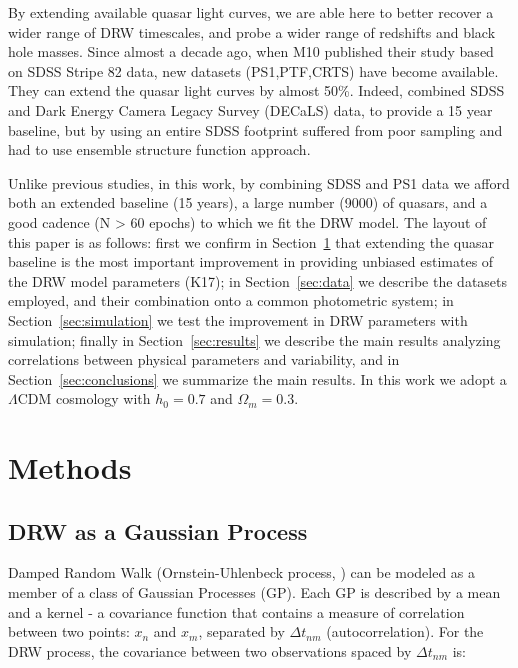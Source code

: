 \documentclass[twocolumn]{aastex62}
\begin{document}
By extending available quasar light curves, we are able here to better recover a wider range of DRW timescales, and probe a wider range of redshifts and black hole masses. Since almost a decade ago, when M10 published their study based on SDSS Stripe 82 data, new datasets (PS1,PTF,CRTS) have become available. They can extend the quasar light curves by almost 50\%.  Indeed, \citet{li2018} combined SDSS and Dark Energy Camera Legacy Survey (DECaLS) data, to provide a 15 year baseline, but by using an entire SDSS footprint suffered from poor sampling and had to use ensemble structure function approach. %



 Unlike previous studies, in this work, by combining SDSS and PS1 data we afford both an extended baseline (15 years), a large number (9000) of quasars, and  a good cadence (N > 60 epochs) to which we fit the DRW model. The layout of this paper is as follows: first we confirm in Section~\ref{sec:methods} that extending the quasar baseline is the most important improvement in providing unbiased estimates of the DRW model parameters (K17);  in Section~\ref{sec:data} we describe the datasets employed, and their combination onto a common photometric system;  in Section~\ref{sec:simulation} we test the improvement in DRW parameters with simulation; finally in Section~\ref{sec:results} we describe the main results analyzing correlations between physical parameters and variability, and in Section~\ref{sec:conclusions} we summarize the main results. In this work we adopt a $\Lambda $CDM cosmology with $h_{0} = 0.7$ and $\Omega_{m} = 0.3 $. 


%
%
\section{Methods}\label{sec:methods}
\subsection{DRW as a Gaussian Process}
Damped Random Walk (Ornstein-Uhlenbeck process, \citealt{rasmussen2006}) can be modeled as a member of a class of Gaussian Processes (GP). Each GP is described by a mean and a kernel - a covariance function that contains a measure of correlation between two points: $x_{n}$ and $x_{m}$, separated by $\Delta t_{nm}$ (autocorrelation). For the  DRW process, the covariance  between two observations spaced by  $\Delta t_{nm}$ is: 
\end{document}
